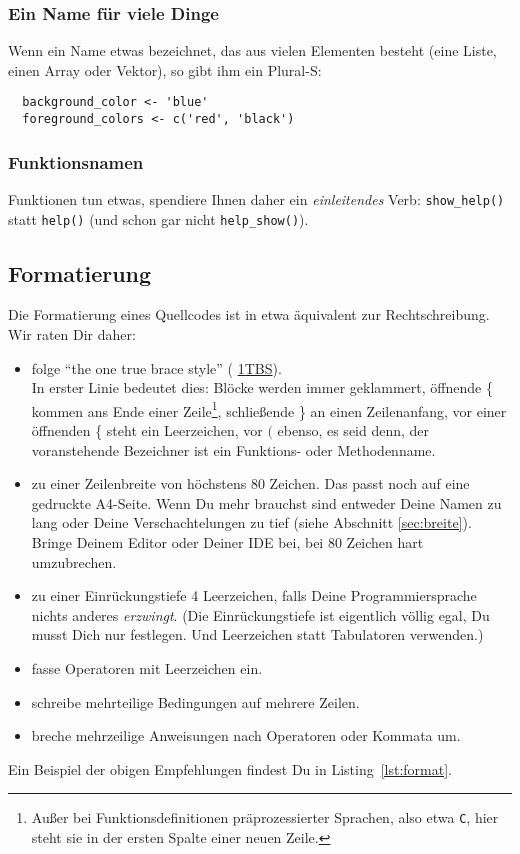 \documentclass[twoside]{scrartcl}
\providecommand{\code}[1]{\texttt{#1}}
\begin{document}
\subsubsection{Ein Name f\"u{}r viele Dinge}
Wenn ein Name etwas bezeichnet, das aus vielen Elementen besteht (eine Liste,
einen Array oder Vektor), so gibt ihm ein Plural-S:
\begin{lstlisting}
  background_color <- 'blue'
  foreground_colors <- c('red', 'black')
\end{lstlisting}

\subsubsection{Funktionsnamen}
Funktionen tun etwas, spendiere Ihnen daher ein \emph{einleitendes} Verb:
\code{show\_help()} statt \code{help()} (und schon gar nicht  
\code{help\_show()}).

\subsection{Formatierung\label{sec:format}}
Die Formatierung eines Quellcodes ist in etwa \"a{}quivalent zur
Rechtschreibung. Wir raten Dir daher:
\begin{itemize}
\item folge "`the one true brace style"' (%
\href{http://en.wikipedia.org/wiki/Indent_style#Variant:_1TBS}{1TBS}).\\
  In erster Linie bedeutet dies: Bl\"o{}cke werden immer geklammert,
  \"o{}ffnende \{ kommen ans Ende einer
      Zeile\footnote{Au\ss{}er bei Funktionsdefinitionen pr\"a{}prozessierter
      Sprachen, also etwa \code{C}, hier steht sie in der ersten Spalte einer
  neuen Zeile.}, schlie\ss{}ende \} an einen Zeilenanfang, 
      vor einer
  \"o{}ffnenden \{ steht ein Leerzeichen, vor $($ ebenso, es seid denn,
  der voranstehende Bezeichner ist ein Funktions- oder Methodenname.
\item zu einer Zeilenbreite von h\"o{}chstens 80 Zeichen. Das passt
  noch auf eine gedruckte A4-Seite. Wenn Du mehr brauchst sind
  entweder Deine Namen zu lang oder Deine Verschachtelungen zu
  tief (siehe Abschnitt \ref{sec:breite}).
  Bringe Deinem Editor oder Deiner IDE bei, bei 80 Zeichen hart
  umzubrechen.
\item zu einer Einr\"u{}ckungstiefe 4 Leerzeichen, falls Deine
  Programmiersprache nichts anderes \emph{erzwingt}.
  (Die Einr\"u{}ckungstiefe ist eigentlich v\"o{}llig egal, Du
  musst Dich nur festlegen. Und Leerzeichen statt
  Tabulatoren verwenden.)
\item fasse Operatoren mit Leerzeichen ein.
\item schreibe mehrteilige Bedingungen auf mehrere Zeilen.
\item breche mehrzeilige Anweisungen nach Operatoren oder Kommata
  um.
\end{itemize}
Ein Beispiel der obigen Empfehlungen 
findest Du in Listing~\ref{lst:format}.

\end{document}
